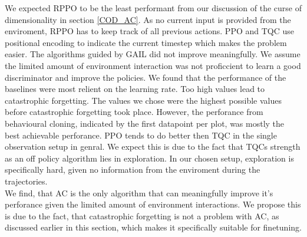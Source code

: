 We expected RPPO to be the least performant from our discussion of the curse of dimensionality in section \ref{COD_AC}. As no current input is provided from the enviroment, RPPO has to keep track of 
all previous actions. PPO and TQC use positional encoding to indicate the current timestep which makes the problem easier. The algorithms guided by GAIL did not improve meaningfully. We assume the limited 
amount of environment interaction was not proficcient to learn a good discriminator and improve the policies. We found that the performance of the baselines were most relient on the learning rate. 
Too high values lead to catastrophic forgetting. The values we chose were the highest possible values before catastrophic forgetting took place. However, the perforance from behavioural cloning, indicated 
by the first datapoint per plot, was mostly the best achievable perforance. PPO tends to do better then TQC in the single observation setup in genral. We expect this is due to the fact that TQCs 
strength as an off policy algorithm lies in exploration. In our chosen setup, exploration is specifically hard, given no information from the enviroment during the trajectories.\\  
We find, that AC is the only algorithm that can meaningfully improve it's perforance given the limited amount of environment interactions. We propose this is due to the fact, that catastrophic forgetting 
is not a problem with AC, as discussed earlier in this section, which makes it specifically suitable for finetuning.

